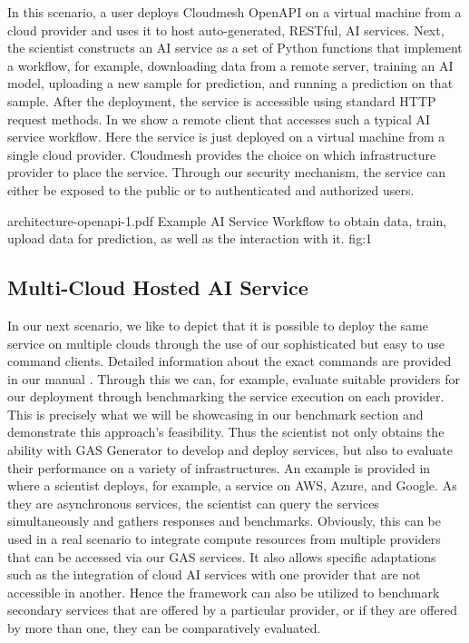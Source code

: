 In this scenario, a user deploys Cloudmesh OpenAPI on a virtual
machine from a cloud provider and uses it to host auto-generated,
RESTful, AI services. Next, the scientist constructs an AI service as
a set of Python functions that implement a workflow, for example,
downloading data from a remote server, training an AI model, uploading
a new sample for prediction, and running a prediction on that
sample. After the deployment, the service is accessible using standard
HTTP request methods. In  we show a remote client that
accesses such a typical AI service workflow.  Here the service is just
deployed on a virtual machine from a single cloud provider. Cloudmesh
provides the choice on which infrastructure provider to place the
service. Through our security mechanism, the service can either be
exposed to the public or to authenticated and authorized users.

\OneFIGURE
  {architecture-openapi-1.pdf}
  {Example AI Service Workflow to obtain data, train, upload data for prediction, as well as the interaction with it.}
  {fig:1}

\subsection{Multi-Cloud Hosted AI Service}

In our next scenario, we like to depict that it is possible to deploy
the same service on multiple clouds through the use of our
sophisticated but easy to use command clients. Detailed information
about the exact commands are provided in our
manual \cite{cloudmesh-manual}. Through this we can, for example,
evaluate suitable providers for our deployment through benchmarking
the service execution on each provider. This is precisely what we will
be showcasing in our benchmark section and demonstrate this approach's
feasibility. Thus the scientist not only obtains the ability with GAS
Generator to develop and deploy services, but also to evaluate their
performance on a variety of infrastructures. An example is provided
in  where a scientist deploys, for example, a service on
AWS, Azure, and Google. As they are asynchronous services, the
scientist can query the services simultaneously and gathers responses
and benchmarks. Obviously, this can be used in a real scenario to
integrate compute resources from multiple providers that can be
accessed via our GAS services. It also allows specific adaptations
such as the integration of cloud AI services with one provider that
are not accessible in another. Hence the framework can also be
utilized to benchmark secondary services that are offered by a
particular provider, or if they are offered by more than one, they can
be comparatively evaluated.


